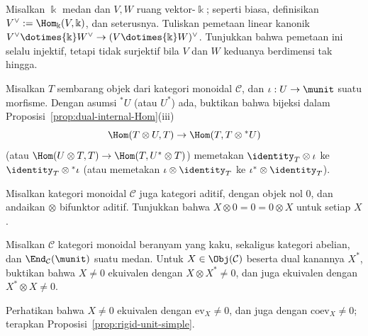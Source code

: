 
\begin{Exercises}
	\item Misalkan $\Bbbk$ medan dan $V,W$ ruang vektor-$\Bbbk$; seperti
	biasa, definisikan $V^\vee:=\Hom_{\Bbbk}(V,\Bbbk)$, dan seterusnya.
	Tuliskan pemetaan linear kanonik
	$V^\vee\dotimes{\Bbbk}W^\vee\to
	(V\dotimes{\Bbbk}W)^\vee$. Tunjukkan bahwa pemetaan ini selalu injektif,
	tetapi tidak surjektif bila $V$ dan $W$ keduanya berdimensi tak hingga.

	\item Misalkan $T$ sembarang objek dari kategori monoidal $\mathcal{C}$,
	dan $\iota:U\to\munit$ suatu morfisme. Dengan asumsi ${}^*U$ (atau
	$U^*$) ada, buktikan bahwa bijeksi dalam
	Proposisi~\ref{prop:dual-internal-Hom}(iii)
	\[ \Hom(T\otimes U,T)\to\Hom(T,T\otimes{}^*U) \]
	(atau $\Hom(U\otimes T,T)\to\Hom(T,U^*\otimes T)$) memetakan
	$\identity_T\otimes\iota$ ke $\identity_T\otimes{}^*\iota$ (atau
	memetakan $\iota\otimes\identity_T$ ke
	$\iota^*\otimes\identity_T$).

	\item Misalkan kategori monoidal $\mathcal{C}$ juga kategori aditif,
	dengan objek nol $0$, dan andaikan $\otimes$ bifunktor aditif. Tunjukkan
	bahwa $X\otimes0=0=0\otimes X$ untuk setiap $X$.

	\item Misalkan $\mathcal{C}$ kategori monoidal beranyam yang kaku,
	sekaligus kategori abelian, dan $\End_{\mathcal{C}}(\munit)$ suatu medan.
	Untuk $X\in\Obj(\mathcal{C})$ beserta dual kanannya $X^*$, buktikan
	bahwa $X\neq0$ ekuivalen dengan $X\otimes X^*\neq0$, dan juga ekuivalen
	dengan $X^*\otimes X\neq0$.
	\begin{hint}
		Perhatikan bahwa $X\neq0$ ekuivalen dengan
		$\mathrm{ev}_X\neq0$, dan juga dengan $\mathrm{coev}_X\neq0$;
		terapkan Proposisi~\ref{prop:rigid-unit-simple}.
	\end{hint}


\end{Exercises}
